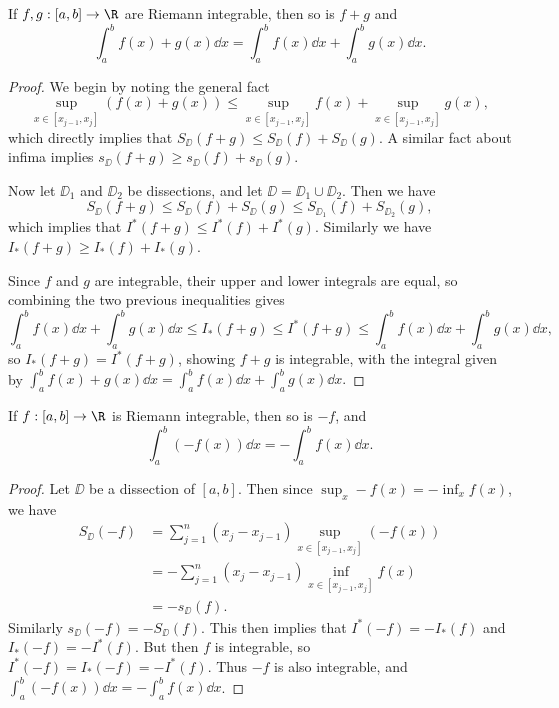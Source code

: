 \documentclass[a4paper]{scrartcl}
\begin{document}
\begin{proposition}
	If $f, g : [a, b] \rightarrow \R$ are Riemann integrable, then so is $f + g$ and
	$$
	\int_a^b f(x) + g(x) \dd x = \int_a^b f(x) \dd x + \int_a^b g(x) \dd x.
	$$
\end{proposition}
\begin{proof}
		We begin by noting the general fact
	$$
	\sup_{x\in[x_{j - 1}, x_j]} (f(x) + g(x)) \leq \sup_{x\in[x_{j - 1}, x_j]}  f(x) + \sup_{x\in[x_{j - 1}, x_j]} g(x),
	$$
	which directly implies that $S_{\DD}(f + g) \leq S_{\DD}(f) + S_{\DD}(g)$. A similar fact about infima implies $s_{\DD}(f + g) \geq s_{\DD}(f) + s_{\DD}(g)$.

	Now let $\DD_1$ and $\DD_2$ be dissections, and let $\DD = \DD_1 \cup \DD_2$. Then we have 
		$$
		S_{\DD}(f + g) \leq S_{\DD}(f) + S_{\DD}(g) \leq S_{\DD_1}(f) + S_{\DD_2}(g),
		$$
		which implies that $I^*(f + g) \leq I^*(f) + I^*(g)$.
		Similarly we have $I_*(f + g) \geq I_*(f) + I_*(g)$.

		Since $f$ and $g$ are integrable, their upper and lower integrals are equal, so combining the two previous inequalities gives
		$$
		\int_a^b f(x) \dd x + \int_a^b g(x) \dd x \leq I_{*}(f+g) \leq I^{*}(f+g) \leq \int_a^b f(x) \dd x + \int_a^b g(x) \dd x,
		$$
		so $I_{*}(f+g) = I^{*}(f+g)$, showing $f + g$ is integrable, with the integral given by
		$
		\int_a^b f(x) + g(x) \dd x = \int_a^b f(x) \dd x + \int_a^b g(x) \dd x.
		$
\end{proof}

\begin{proposition}
	If $f:[a, b] \rightarrow \R$ is Riemann integrable, then so is $-f$, and
	$$
	\int_a^b (-f(x)) \dd x = - \int_a^b f(x) \dd x.
	$$
\end{proposition}
\begin{proof}
	Let $\DD$ be a dissection of $[a, b]$. Then since $\sup_x -f(x) = - \inf_x f(x)$, we have
	\begin{align*}
		S_{\DD} (-f) &= \sum_{j = 1}^n (x_{j} - x_{j - 1}) \sup_{x \in[x_{j - 1}, x_j]} (-f(x)) \\
		&= -\sum_{j = 1}^n (x_{j} - x_{j - 1}) \inf_{x \in[x_{j - 1}, x_j]} f(x) \\
		&= -s_\DD(f).
	\end{align*}
	Similarly $s_\DD(-f) = -S_\DD(f)$. This then implies that $I^*(-f) = -I_*(f)$ and $I_*(-f) = -I^*(f)$. But then $f$ is integrable, so $I^*(-f) = I_*(-f) = -I^*(f)$. Thus $-f$ is also integrable, and $\int_a^b (-f(x)) \dd x = - \int_a^b f(x) \dd x$.
\end{proof}
\end{document}
